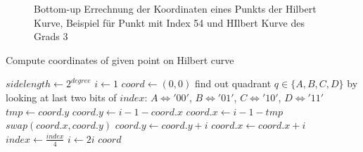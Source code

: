\documentclass[course=erap]{aspdoc}
\begin{document}
\begin{figure}[H] 
    \centering
    \caption{Bottom-up Errechnung der Koordinaten eines Punkts der Hilbert Kurve, Beispiel für Punkt mit Index 54 und HIlbert Kurve des Grads 3}%
    \label{fig:hilbertBuildup}%
\end{figure}


\begin{algorithm}[H]
\begin{algorithmic}
\caption{Compute coordinates of given point on Hilbert curve}
\label{hilbert:iterative}
	\State $sidelength \leftarrow 2^{degree}$
	\State $i \leftarrow 1$
	\State $coord \leftarrow (0, 0)$
		\State find out quadrant $q \in \{A, B, C, D\}$ by looking at last two bits of $index$:
		\State $A \iff '00'$, $B \iff '01'$, $C \iff '10'$, $D \iff '11'$
			\State $tmp \leftarrow coord.y$
			\State $coord.y \leftarrow i - 1 - coord.x$
			\State $coord.x \leftarrow i - 1 - tmp$	
			\Else 
			\State $swap(coord.x, coord.y)$
			\EndIf
		\Else 
		\State $coord.y \leftarrow coord.y + i$ 
		\EndIf
		\State $coord.x \leftarrow coord.x + i$ 
		\EndIf
		\State $index \leftarrow \frac{index}{4}$ 
		\State $i \leftarrow 2i$
	\EndWhile
	\State \Return $coord$
\EndFunction
\end{algorithmic}
\end{algorithm}
\end{document}

